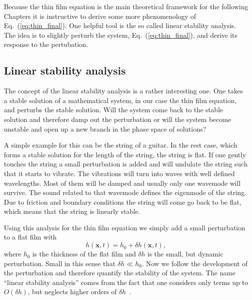 Because the thin film equation is the main theoretical framework for the following Chapters it is instructive to derive some more phenomenology of Eq.~(\ref{eq:thin_final}).
One helpful tool is the so called linear stability analysis. 
The idea is to slightly perturb the system, Eq.~(\ref{eq:thin_final}), and derive its response to the pertubation.

\subsection{Linear stability analysis}
\label{susbsec:Lin_stab}
The concept of the linear stability analysis is a rather interesting one.
One takes a stable solution of a mathematical system, in our case the thin film equation, and perturbs the stable solution.
Will the system come back to the stable solution and therefore damp out the perturbation or will the system become unstable and open up a new branch in the phase space of solutions?

A simple example for this can be the string of a guitar.
In the rest case, which forms a stable solution for the length of the string, the string is flat.
If one gently touches the string a small perturbation is added and will undulate the string such that it starts to vibrate.
The vibrations will turn into waves with well defined wavelengths. 
Most of them will be damped and usually only one wavemode will survive.
The sound related to that wavemode defines the eigenmode of the string.
Due to friction and boundary conditions the string will come go back to be flat, which means that the string is linearly stable.

Using this analysis for the thin film equation we simply add a small perturbation to a flat film with
\begin{equation}\label{eq:lin_stab_delta}
    h(\mathbf{x},t) = h_0 + \delta h(\mathbf{x},t),
\end{equation}
where $h_0$ is the thickness of the flat film and $\delta h$ is the small, but dynamic perturbation.
Small in this sense that $\delta h \ll h_0$.
Now we follow the development of the perturbation and therefore quantify the stability of the system.
The name ``linear stability analysis'' comes from the fact that one considers only terms up to $O(\delta h)$, but neglects higher orders of $\delta h$~\cite{laugesenLinearStabilitySteady2000}.

